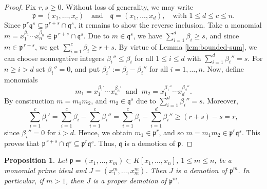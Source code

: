 \documentclass[11pt]{amsart}
\newtheorem{proposition}[theorem]{Proposition}
\begin{document}
\begin{proof}
Fix $r,s \geq 0$. Without loss of generality, we may write
\[
\mathfrak{p} = (x_1, \dots, x_c)
\quad \text{and} \quad 
\mathfrak{q} = (x_1, \dots, x_d),
\quad \text{with } 1 \leq d \leq c \leq n.
\]
Since $\mathfrak{p}^r \mathfrak{q}^s \subseteq \mathfrak{p}^{r+s} \cap \mathfrak{q}^s$, 
it remains to show the reverse inclusion. Take a monomial $m=x_1^{\beta_1}\cdots x_n^{\beta_n}\in\mathfrak{p}^{\,r+s}\cap\mathfrak{q}^s.$
Due to  $m\in\mathfrak{q}^s$, we have $\sum_{i=1}^d\beta_i\ge s$, and since
$m\in\mathfrak{p}^{\,r+s}$, we get  $\sum_{i=1}^c\beta_i\ge r+s$. By virtue of Lemma  \ref{lem:bounded-sum}, we can choose nonnegative integers $\beta_i''\le\beta_i$ for all $1\le i\le d$ with  $\sum_{i=1}^d\beta_i''=s$.  For $n\geq i>d$ set $\beta_i''=0$, and put $\beta_i':=\beta_i-\beta_i''$ 
for all $i=1,\dots,n$. Now, define monomials
\[
m_1=x_1^{\beta_1'}\cdots x_n^{\beta_n'}\;\; \text{and} \;\;
m_2=x_1^{\beta_1''}\cdots x_d^{\beta_d''}.
\]
By construction $m=m_1m_2$, and $m_2\in\mathfrak{q}^s$ due to  $\sum_{i=1}^d\beta_i''=s$. Moreover,
\[
\sum_{i=1}^c\beta_i'=\sum_{i=1}^c\beta_i-\sum_{i=1}^c\beta_i''
=\sum_{i=1}^c\beta_i-\sum_{i=1}^d\beta_i''\ge (r+s)-s=r,
\]
since  $\beta_i''=0$ for $i>d$. Hence, we obtain $m_1\in\mathfrak{p}^r$, and so  $m=m_1m_2\in\mathfrak{p}^r\mathfrak{q}^s$. This proves that $\mathfrak{p}^{\,r+s}\cap\mathfrak{q}^s\subseteq\mathfrak{p}^r\mathfrak{q}^s$. 
Thus,  $\mathfrak{q}$ is a demotion of $\mathfrak{p}$.
\end{proof}







\begin{proposition} \label{Demotion-4}
Let $\mathfrak{p}=(x_1, \dots, x_m) \subset K[x_1, \dots, x_n]$, $1\leq m\leq n$, be a monomial prime ideal and  $J=(x_1^m, \dots, x_m^m)$.  
Then  $J$ is a demotion of $\mathfrak{p}^m$. In particular, if $m>1$, then $J$ is a proper demotion of $\mathfrak{p}^m$. 
\end{proposition}
\end{document}
